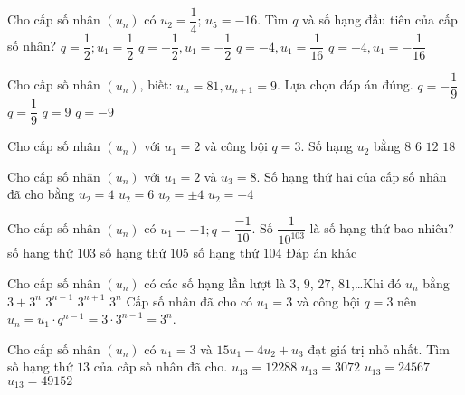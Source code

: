 \begin{ex}%
	Cho cấp số nhân $(u_n)$ có $u_2=\dfrac{1}{4}$; $u_5=-16$. Tìm $q$ và số hạng đầu tiên của cấp số nhân?
	\choice
	{$q=\dfrac{1}{2};u_1=\dfrac{1}{2}$}
	{$q=-\dfrac{1}{2},u_1=-\dfrac{1}{2}$}
	{\True $q=-4,u_1=\dfrac{1}{16}$}
	{$q=-4,u_1=-\dfrac{1}{16}$}
\end{ex}
\begin{ex}%
	Cho cấp số nhân $(u_n)$, biết: $u_n=81,u_{n+1}=9$. Lựa chọn đáp án đúng.
	\choice
	{$q=-\dfrac{1}{9}$}
	{\True $q=\dfrac{1}{9}$}
	{$q=9$}
	{$q=-9$}
\end{ex}
\begin{ex}%
	Cho cấp số nhân $\left( {u_n} \right)$ với $u_1=2$ và công bội $q=3$. Số hạng $u_2$ bằng
	\choice
	{$8$}
	{\True $6$}
	{$12$}
	{$18$}
\end{ex}
\begin{ex}%
	Cho cấp số nhân $(u_n)$ với $u_1=2$ và $u_3=8$. Số hạng thứ hai của cấp số nhân đã cho bằng
	\choice
	{$u_2=4$}
	{$u_2=6$}
	{\True $u_2=\pm 4$}
	{$u_2=-4$}
\end{ex}
\begin{ex}%
	Cho cấp số nhân $(u_n)$ có $u_1=-1; q=\dfrac{-1}{10}$. Số $\dfrac{1}{10^{103}}$ là số hạng thứ bao nhiêu?
	\choice
	{số hạng thứ $103$}
	{số hạng thứ $105$}
	{\True số hạng thứ $104$}
	{Đáp án khác}
\end{ex}
\begin{ex}%
	Cho cấp số nhân $\left(u_n\right)$ có các số hạng lần lượt là $3$, $9$, $27$, $81$,\ldots Khi đó $u_n$ bằng
	\choice
	{$3+3^n$}
	{$3^{n-1}$}
	{$3^{n+1}$}
	{\True $3^n$}
	\loigiai
	{Cấp số nhân đã cho có $u_1=3$ và công bội $q=3$ nên $u_n=u_1\cdot q^{n-1}=3\cdot 3^{n-1}=3^n$.
	}
\end{ex}
\begin{ex}%
	Cho cấp số nhân $(u_n)$ có $u_1=3$ và $15u_1-4u_2+u_3$ đạt giá trị nhỏ nhất. Tìm số hạng thứ $13$ của cấp số nhân đã cho.
	\choice
	{\True $u_{13}=12288$}
	{$u_{13}=3072$}
	{$u_{13}=24567$}
	{$u_{13}=49152$}
\end{ex}

